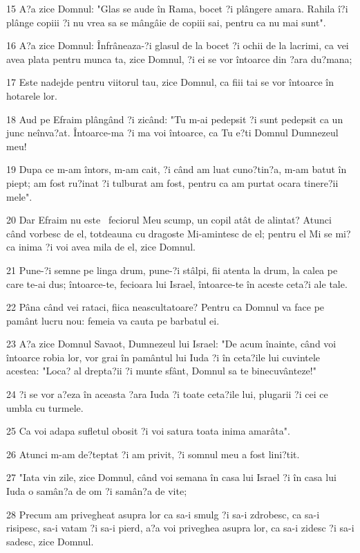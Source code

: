 \par 15 A?a zice Domnul: "Glas se aude în Rama, bocet ?i plângere amara. Rahila î?i plânge copiii ?i nu vrea sa se mângâie de copiii sai, pentru ca nu mai sunt".
\par 16 A?a zice Domnul: Înfrâneaza-?i glasul de la bocet ?i ochii de la lacrimi, ca vei avea plata pentru munca ta, zice Domnul, ?i ei se vor întoarce din ?ara du?mana;
\par 17 Este nadejde pentru viitorul tau, zice Domnul, ca fiii tai se vor întoarce în hotarele lor.
\par 18 Aud pe Efraim plângând ?i zicând: "Tu m-ai pedepsit ?i sunt pedepsit ca un junc neînva?at. Întoarce-ma ?i ma voi întoarce, ca Tu e?ti Domnul Dumnezeul meu!
\par 19 Dupa ce m-am întors, m-am cait, ?i când am luat cuno?tin?a, m-am batut în piept; am fost ru?inat ?i tulburat am fost, pentru ca am purtat ocara tinere?ii mele".
\par 20 Dar Efraim nu este  feciorul Meu scump, un copil atât de alintat? Atunci când vorbesc de el, totdeauna cu dragoste Mi-amintesc de el; pentru el Mi se mi?ca inima ?i voi avea mila de el, zice Domnul.
\par 21 Pune-?i semne pe linga drum, pune-?i stâlpi, fii atenta la drum, la calea pe care te-ai dus; întoarce-te, fecioara lui Israel, întoarce-te în aceste ceta?i ale tale.
\par 22 Pâna când vei rataci, fiica neascultatoare? Pentru ca Domnul va face pe pamânt lucru nou: femeia va cauta pe barbatul ei.
\par 23 A?a zice Domnul Savaot, Dumnezeul lui Israel: "De acum înainte, când voi întoarce robia lor, vor grai în pamântul lui Iuda ?i în ceta?ile lui cuvintele acestea: "Loca? al drepta?ii ?i munte sfânt, Domnul sa te binecuvânteze!"
\par 24 ?i se vor a?eza în aceasta ?ara Iuda ?i toate ceta?ile lui, plugarii ?i cei ce umbla cu turmele.
\par 25 Ca voi adapa sufletul obosit ?i voi satura toata inima amarâta".
\par 26 Atunci m-am de?teptat ?i am privit, ?i somnul meu a fost lini?tit.
\par 27 "Iata vin zile, zice Domnul, când voi semana în casa lui Israel ?i în casa lui Iuda o samân?a de om ?i samân?a de vite;
\par 28 Precum am privegheat asupra lor ca sa-i smulg ?i sa-i zdrobesc, ca sa-i risipesc, sa-i vatam ?i sa-i pierd, a?a voi priveghea asupra lor, ca sa-i zidesc ?i sa-i sadesc, zice Domnul.
